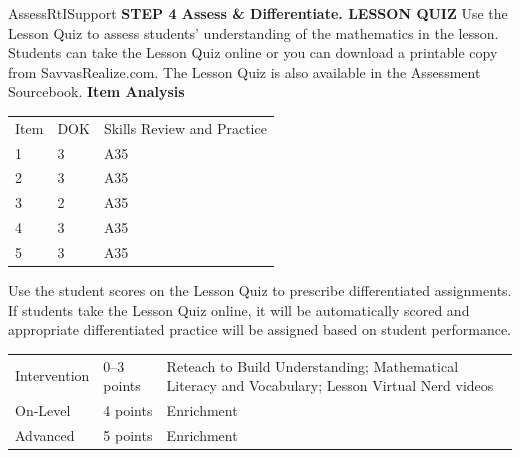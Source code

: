 \documentclass{article}
\newenvironment{te-addendum}[2]{}{}     %
\begin{document}
\begin{te-addendum}{Assess}{RtISupport}
\textbf{STEP 4 Assess & Differentiate. LESSON QUIZ}
Use the Lesson Quiz to assess students' understanding of the mathematics in the lesson.
Students can take the Lesson Quiz online or you can download a printable copy from SavvasRealize.com. The Lesson Quiz is also available in the Assessment Sourcebook.
\textbf{Item Analysis}
\begin{tabular}{lll}
Item & DOK & Skills Review and Practice \\
1 & 3 & A35 \\
2 & 3 & A35 \\
3 & 2 & A35 \\
4 & 3 & A35 \\
5 & 3 & A35 \\
\end{tabular}
Use the student scores on the Lesson Quiz to prescribe differentiated assignments.
If students take the Lesson Quiz online, it will be automatically scored and appropriate differentiated practice will be assigned based on student performance.
\begin{tabular}{lll}
Intervention & 0--3 points & Reteach to Build Understanding; Mathematical Literacy and Vocabulary; Lesson Virtual Nerd videos \\
On-Level & 4 points & Enrichment \\
Advanced & 5 points & Enrichment \\
\end{tabular}
\end{te-addendum}
\end{document}
